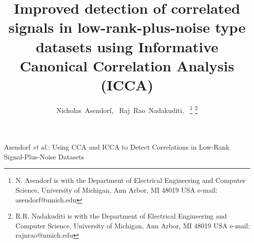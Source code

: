 \documentclass[journal]{IEEEtran}
\begin{document}
\title{Improved detection of correlated signals in low-rank-plus-noise type datasets using Informative Canonical Correlation Analysis (ICCA) }
%
%
%

\author{Nicholas~Asendorf,~
        Raj~Rao~Nadakuditi,~%
\thanks{N. Asendorf is with the Department
of Electrical Engineering and Computer Science, University of Michigan, Ann Arbor, MI
 48019 USA e-mail: asendorf@umich.edu}%
\thanks{R.R. Nadakuditi is with the Department
of Electrical Engineering and Computer Science, University of Michigan, Ann Arbor, MI
 48019 USA e-mail: rajnrao@umich.edu}}%

%
%



%
{Asendorf \MakeLowercase{\textit{et al.}}: Using CCA and ICCA to Detect Correlations in Low-Rank Signal-Plus-Noise Datasets}
%
\end{document}
